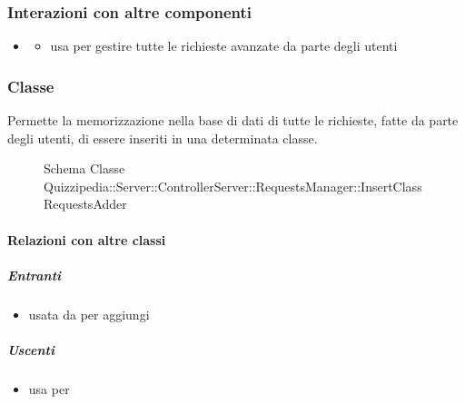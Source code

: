 \subsubsection{Interazioni con altre componenti}
\begin{itemize}
\item {}
\begin{itemize}
\item usa  per gestire tutte le richieste avanzate da parte degli utenti
\end{itemize}
\end{itemize}
\subsubsection{Classe }
Permette la memorizzazione nella base di dati di tutte le richieste, fatte da parte degli utenti, di essere inseriti in una determinata classe.
\begin{figure}[H]
\centering
\noindent{}
\caption[Schema Classe InsertClassRequestsAdder]{Schema Classe Quizzipedia::Server::ControllerServer::RequestsManager::InsertClassRequestsAdder}
\end{figure}
\paragraph{Relazioni con altre classi}
\subparagraph{Entranti}
\begin{itemize}
\item usata da  per aggiungi
\end{itemize}
\subparagraph{Uscenti}
\begin{itemize}
\item usa  per 
\end{itemize}
